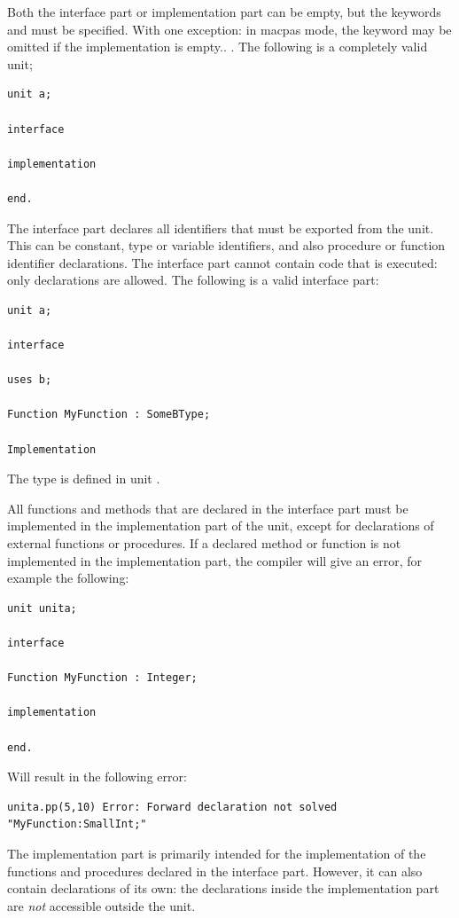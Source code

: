 Both the interface part or implementation part can be empty, but the
keywords  and  must be specified.
With one exception: in macpas mode, the  
keyword may be omitted if the implementation is empty..
.
The following is a completely valid unit;
\begin{verbatim}
unit a;

interface

implementation

end.
\end{verbatim}

The interface part declares all identifiers that must be exported from the
unit. This can be constant, type or variable identifiers, and also procedure
or function identifier declarations.  The interface part cannot contain code
that is executed: only declarations are allowed. The following is a valid
interface part:
\begin{verbatim}
unit a;

interface

uses b;

Function MyFunction : SomeBType;

Implementation
\end{verbatim}
The type  is defined in unit .

All functions and methods that are declared in the interface part must
be implemented in the implementation part of the unit, except for
declarations of external functions or procedures. If a declared method
or function is not implemented in the implementation part, the compiler
will give an error, for example the following:
\begin{verbatim}
unit unita;

interface

Function MyFunction : Integer;

implementation

end.
\end{verbatim}
Will result in the following error:
\begin{verbatim}
unita.pp(5,10) Error: Forward declaration not solved "MyFunction:SmallInt;"
\end{verbatim}

The implementation part is primarily intended for the implementation of the
functions and procedures declared in the interface part. However, it can
also contain declarations of its own: the declarations inside the
implementation part are {\em not} accessible outside the unit.

